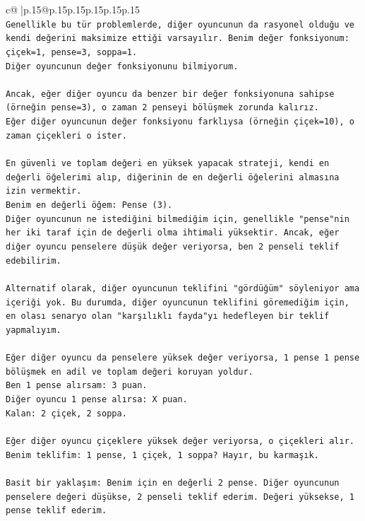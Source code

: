 \documentclass{article}
\begin{document}
{\begin{supertabular}{c@{$\;$}|p{.15\linewidth}@{}p{.15\linewidth}p{.15\linewidth}p{.15\linewidth}p{.15\linewidth}p{.15\linewidth}}
{{{\\ 
\texttt{Genellikle bu tür problemlerde, diğer oyuncunun da rasyonel olduğu ve kendi değerini maksimize ettiği varsayılır. Benim değer fonksiyonum: çiçek=1, pense=3, soppa=1.} \\
\texttt{Diğer oyuncunun değer fonksiyonunu bilmiyorum.} \\
\\ 
\texttt{Ancak, eğer diğer oyuncu da benzer bir değer fonksiyonuna sahipse (örneğin pense=3), o zaman 2 penseyi bölüşmek zorunda kalırız.} \\
\texttt{Eğer diğer oyuncunun değer fonksiyonu farklıysa (örneğin çiçek=10), o zaman çiçekleri o ister.} \\
\\ 
\texttt{En güvenli ve toplam değeri en yüksek yapacak strateji, kendi en değerli öğelerimi alıp, diğerinin de en değerli öğelerini almasına izin vermektir.} \\
\texttt{Benim en değerli öğem: Pense (3).} \\
\texttt{Diğer oyuncunun ne istediğini bilmediğim için, genellikle "pense"nin her iki taraf için de değerli olma ihtimali yüksektir. Ancak, eğer diğer oyuncu penselere düşük değer veriyorsa, ben 2 penseli teklif edebilirim.} \\
\\ 
\texttt{Alternatif olarak, diğer oyuncunun teklifini "gördüğüm" söyleniyor ama içeriği yok. Bu durumda, diğer oyuncunun teklifini göremediğim için, en olası senaryo olan "karşılıklı fayda"yı hedefleyen bir teklif yapmalıyım.} \\
\\ 
\texttt{Eğer diğer oyuncu da penselere yüksek değer veriyorsa, 1 pense 1 pense bölüşmek en adil ve toplam değeri koruyan yoldur.} \\
\texttt{Ben 1 pense alırsam: 3 puan.} \\
\texttt{Diğer oyuncu 1 pense alırsa: X puan.} \\
\texttt{Kalan: 2 çiçek, 2 soppa.} \\
\\ 
\texttt{Eğer diğer oyuncu çiçeklere yüksek değer veriyorsa, o çiçekleri alır.} \\
\texttt{Benim teklifim: 1 pense, 1 çiçek, 1 soppa? Hayır, bu karmaşık.} \\
\\ 
\texttt{Basit bir yaklaşım: Benim için en değerli 2 pense. Diğer oyuncunun penselere değeri düşükse, 2 penseli teklif ederim. Değeri yüksekse, 1 pense teklif ederim.} \\
}}}
\end{supertabular}}
\end{document}
